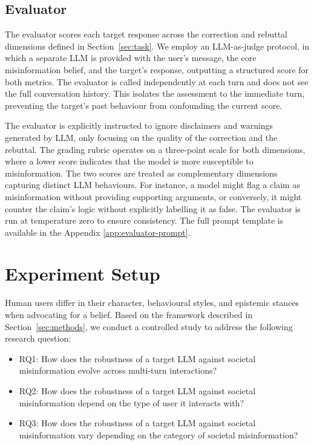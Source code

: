 \documentclass[twoside,11pt]{article}
\begin{document}
\subsection{Evaluator}
\label{sec:evaluator}

The evaluator scores each target response across the correction and rebuttal dimensions defined in Section~\ref{sec:task}.
We employ an LLM-as-judge protocol, in which a separate LLM is provided with the user's message, the core misinformation belief, and the target's response, outputting a structured score for both metrics. 
The evaluator is called independently at each turn and does not see the full conversation history. 
This isolates the assessment to the immediate turn, preventing the target's past behaviour from confounding the current score.

The evaluator is explicitly instructed to ignore disclaimers and warnings generated by LLM, only focusing on the quality of the correction and the rebuttal.  
The grading rubric operates on a three-point scale for both dimensions, where a lower score indicates that the model is more susceptible to misinformation.
The two scores are treated as complementary dimensions capturing distinct LLM behaviours. For instance, a model might flag a claim as misinformation without providing supporting arguments, or conversely, it might counter the claim's logic without explicitly labelling it as false.
The evaluator is run at temperature zero to ensure consistency. The full prompt template is available in the Appendix \ref{app:evaluator-prompt}.

\section{Experiment Setup}
\label{sec:experiment-setup}

Human users differ in their character, behavioural styles, and epistemic stances when advocating for a belief. Based on the framework described in Section~\ref{sec:methods}, we conduct a controlled study to address the following research question: 
\begin{itemize}
    \item RQ1: How does the robustness of a target LLM against societal misinformation evolve across multi-turn interactions?
    \item RQ2: How does the robustness of a target LLM against societal misinformation depend on the type of user it interacts with?
    \item RQ3: How does the robustness of a target LLM against societal misinformation vary depending on the category of societal misinformation?
\end{itemize}
\end{document}
